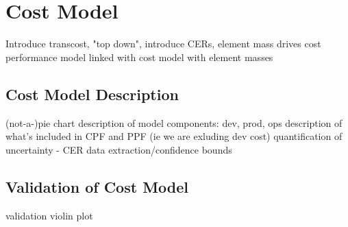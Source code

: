 \documentclass[conf]{new-aiaa}
\begin{document}
\section{Cost Model}
Introduce transcost, "top down", introduce CERs, element mass drives cost
performance model linked with cost model with element masses

\subsection{Cost Model Description}
(not-a-)pie chart
description of model components: dev, prod, ops
description of what's included in CPF and PPF (ie we are exluding dev cost)
quantification of uncertainty - CER data extraction/confidence bounds

\subsection{Validation of Cost Model}
validation violin plot


\end{document}
